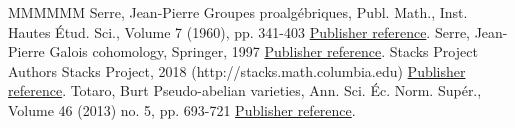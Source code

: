 \documentclass[11pt]{article}
\theoremstyle{definition}
\numberwithin{equation}{section}
\theoremstyle{remark}
\begin{document}
\begin{thebibliography}{MMMMMM}
 Serre, Jean-Pierre Groupes proalgébriques, Publ. Math., Inst. Hautes Étud. Sci., Volume 7 (1960), pp. 341-403 \href{https://ahl.centre-mersenne.org/item/AHL_2020__3__1_0/#Se60}{Publisher reference}.
 Serre, Jean-Pierre Galois cohomology, Springer, 1997 \href{https://ahl.centre-mersenne.org/item/AHL_2020__3__1_0/#Se97}{Publisher reference}.
 Stacks Project Authors Stacks Project, 2018 (http://stacks.math.columbia.edu) \href{https://ahl.centre-mersenne.org/item/AHL_2020__3__1_0/#SP}{Publisher reference}.
 Totaro, Burt Pseudo-abelian varieties, Ann. Sci. Éc. Norm. Supér., Volume 46 (2013) no. 5, pp. 693-721 \href{https://ahl.centre-mersenne.org/item/AHL_2020__3__1_0/#Totaro}{Publisher reference}.
\end{thebibliography}
\end{document}
